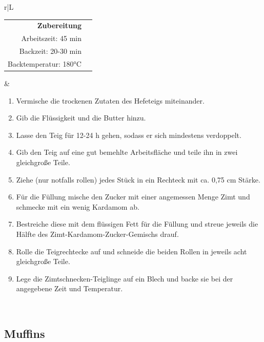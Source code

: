 \documentclass[a4paper, 12pt]{scrbook} 								%
\numberwithin{equation}{section} 									%
\begin{document}
		\newpage
		\begin{tabularx}{\textwidth}{r|L}
			\begin{tabular}[t]{rr}
				\textbf{Zubereitung}	\\
				Arbeitszeit: 45 min	\\
				Backzeit: 20-30 min	\\
				Backtemperatur: 180°C \\
			\end{tabular}			&	\begin{enumerate}[nosep]
											\item Vermische die trockenen Zutaten des Hefeteigs miteinander.
											\item Gib die Flüssigkeit und die Butter hinzu.
											\item Lasse den Teig für 12-24 h gehen, sodass er sich mindestens verdoppelt.
											\item Gib den Teig auf eine gut bemehlte Arbeitsfläche und teile ihn in zwei gleichgroße Teile.
											\item Ziehe (nur notfalls rollen) jedes Stück in ein Rechteck mit ca. 0,75 cm Stärke.
											\item Für die Füllung mische den Zucker mit einer angemessen Menge Zimt und schmecke mit ein wenig Kardamom ab.
											\item Bestreiche diese mit dem flüssigen Fett für die Füllung und streue jeweils die Hälfte des Zimt-Kardamom-Zucker-Gemischs drauf.
											\item Rolle die Teigrechtecke auf und schneide die beiden Rollen in jeweils acht gleichgroße Teile.
											\item Lege die Zimtschnecken-Teiglinge auf ein Blech und backe sie bei der angegebene Zeit und Temperatur.
										\end{enumerate}	\\
		\end{tabularx}
		\newpage


		\subsection{Muffins}	\label{muffins}
\end{document}
